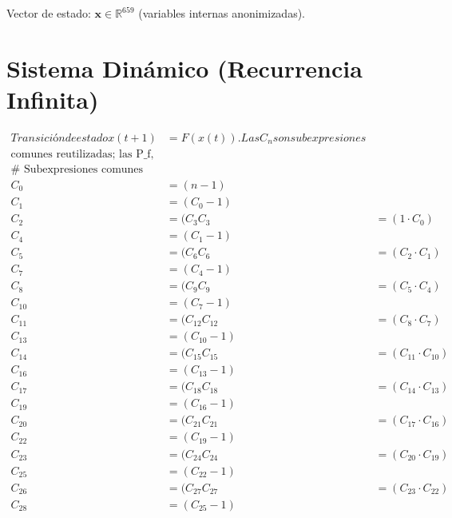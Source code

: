 \documentclass[10pt, a4paper]{article}
\begin{document}
Vector de estado: $\mathbf{x} \in \mathbb{R}^{659}$ (variables internas anonimizadas).\\\part{Sistema Dinámico (Recurrencia Infinita)}
\begin{align*}
Transición de estado x(t+1) &= F(x(t)). Las C_n son subexpresiones \\
\text{comunes reutilizadas; las P_f, relaciones de funciones recursivas.} \\
\text{# Subexpresiones comunes} \\
C_0 &= (n - 1) \\
C_1 &= (C_{0} - 1) \\
C_2 &= (C_{3} %
C_3 &= (1  \cdot  C_{0}) \\
C_4 &= (C_{1} - 1) \\
C_5 &= (C_{6} %
C_6 &= (C_{2}  \cdot  C_{1}) \\
C_7 &= (C_{4} - 1) \\
C_8 &= (C_{9} %
C_9 &= (C_{5}  \cdot  C_{4}) \\
C_10 &= (C_{7} - 1) \\
C_11 &= (C_{12} %
C_12 &= (C_{8}  \cdot  C_{7}) \\
C_13 &= (C_{10} - 1) \\
C_14 &= (C_{15} %
C_15 &= (C_{11}  \cdot  C_{10}) \\
C_16 &= (C_{13} - 1) \\
C_17 &= (C_{18} %
C_18 &= (C_{14}  \cdot  C_{13}) \\
C_19 &= (C_{16} - 1) \\
C_20 &= (C_{21} %
C_21 &= (C_{17}  \cdot  C_{16}) \\
C_22 &= (C_{19} - 1) \\
C_23 &= (C_{24} %
C_24 &= (C_{20}  \cdot  C_{19}) \\
C_25 &= (C_{22} - 1) \\
C_26 &= (C_{27} %
C_27 &= (C_{23}  \cdot  C_{22}) \\
C_28 &= (C_{25} - 1) \\

\end{align*}
\end{document}
